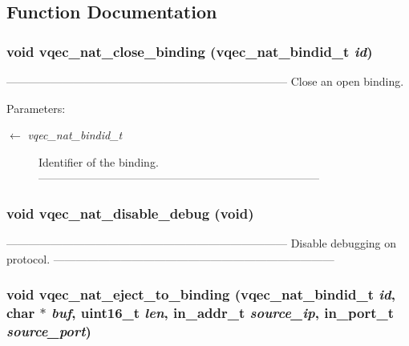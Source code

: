 \subsection{Function Documentation}
\subsubsection{\setlength{\rightskip}{0pt plus 5cm}void vqec\_\-nat\_\-close\_\-binding (vqec\_\-nat\_\-bindid\_\-t {\em id})}\label{vqec__nat__interface_8h_cdca6fc3afa0147f86504eaaf531ca89}


--------------------------------------------------------------------------- Close an open binding.

\begin{Desc}
\item[Parameters:]
\begin{description}
\item[\mbox{$\leftarrow$} {\em vqec\_\-nat\_\-bindid\_\-t}]Identifier of the binding. --------------------------------------------------------------------------- \end{description}
\end{Desc}
\subsubsection{\setlength{\rightskip}{0pt plus 5cm}void vqec\_\-nat\_\-disable\_\-debug (void)}\label{vqec__nat__interface_8h_64d18e023ac58deec48f819796f07917}


--------------------------------------------------------------------------- Disable debugging on protocol. --------------------------------------------------------------------------- 
\subsubsection{\setlength{\rightskip}{0pt plus 5cm}void vqec\_\-nat\_\-eject\_\-to\_\-binding (vqec\_\-nat\_\-bindid\_\-t {\em id}, char $\ast$ {\em buf}, uint16\_\-t {\em len}, in\_\-addr\_\-t {\em source\_\-ip}, in\_\-port\_\-t {\em source\_\-port})}\label{vqec__nat__interface_8h_a72964d0432ce95945839d0ce77d6bc7}


